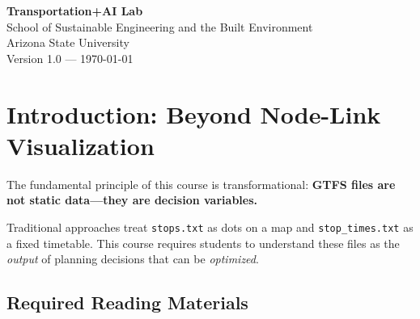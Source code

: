\documentclass[11pt,letterpaper]{article}
\begin{document}
\begin{titlepage}
\vfill

\textbf{Transportation+AI Lab}\\
School of Sustainable Engineering and the Built Environment\\
Arizona State University\\[0.5cm]

{\small Version 1.0 --- \today}
\end{titlepage}

\tableofcontents
\newpage

\section{Introduction: Beyond Node-Link Visualization}

The fundamental principle of this course is transformational: \textbf{GTFS files are not static data---they are decision variables.}

Traditional approaches treat \texttt{stops.txt} as dots on a map and \texttt{stop\_times.txt} as a fixed timetable. This course requires students to understand these files as the \emph{output} of planning decisions that can be \emph{optimized}.

\subsection{Required Reading Materials}
\end{document}
